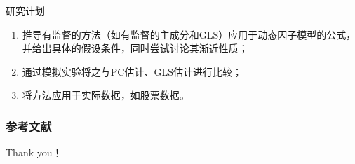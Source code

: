 \documentclass{beamer}
\newcommand{\chuhao}{\fontsize{44.9pt}{\baselineskip}\selectfont}
\begin{document}
\begin{frame}{研究计划}
	\begin{enumerate}
		\setlength\itemsep{1.2em}
		\item 推导有监督的方法（如有监督的主成分和GLS）应用于动态因子模型的公式，并给出具体的假设条件，同时尝试讨论其渐近性质；
		\item 通过模拟实验将之与PC估计、GLS估计进行比较；
		\item 将方法应用于实际数据，如股票数据。
	\end{enumerate}
\end{frame}


\begin{frame}[t,allowframebreaks]
	\frametitle{参考文献}
	\printbibliography[title=参考文献]
\end{frame}
\begin{frame}
	\chuhao{} {Thank you！}
\end{frame}
\end{document}
